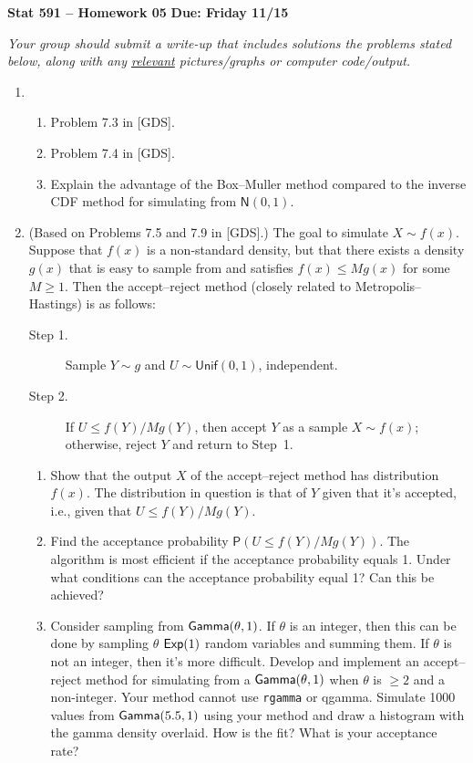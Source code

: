 \documentclass[a4paper,12pt]{article}
\newcommand{\prob}{\mathsf{P}}
\newcommand{\nm}{\mathsf{N}}
\newcommand{\unif}{\mathsf{Unif}}
\begin{document}
\noindent \large \textbf{Stat 591 -- Homework 05} \hfill \textbf{Due: Friday 11/15} \normalsize

\medskip

\noindent \emph{Your group should submit a write-up that includes solutions the problems stated below, along with any \underline{relevant} pictures/graphs or computer code/output.}  

\medskip

\begin{enumerate}

\item 
\begin{enumerate}
\item Problem 7.3 in [GDS].
\item Problem 7.4 in [GDS].  
\item Explain the advantage of the Box--Muller method compared to the inverse CDF method for simulating from $\nm(0,1)$.
\end{enumerate}

\item (Based on Problems 7.5 and 7.9 in [GDS].)  The goal to simulate $X \sim f(x)$.  Suppose that $f(x)$ is a non-standard density, but that there exists a density $g(x)$ that is easy to sample from and satisfies $f(x) \leq M g(x)$ for some $M \geq 1$.  Then the accept--reject method (closely related to Metropolis--Hastings) is as follows:  
\begin{description}
\item[\sc Step 1.] Sample $Y \sim g$ and $U \sim \unif(0,1)$, independent.  
\vspace{-1mm}
\item[\sc Step 2.] If $U \leq f(Y) / Mg(Y)$, then accept $Y$ as a sample $X \sim f(x)$; otherwise, reject $Y$ and return to Step~1. 
\end{description}
\begin{enumerate}
\item Show that the output $X$ of the accept--reject method has distribution $f(x)$.  The distribution in question is that of $Y$ given that it's accepted, i.e., given that $U \leq f(Y) / Mg(Y)$.  
\item Find the acceptance probability $\prob(U \leq f(Y) / M g(Y))$.  The algorithm is most efficient if the acceptance probability equals 1.  Under what conditions can the acceptance probability equal 1?  Can this be achieved?
\item Consider sampling from ${\sf Gamma}(\theta,1)$.  If $\theta$ is an integer, then this can be done by sampling $\theta$ ${\sf Exp}(1)$ random variables and summing them.  If $\theta$ is not an integer, then it's more difficult.  Develop and implement an accept--reject method for simulating from a ${\sf Gamma}(\theta,1)$ when $\theta$ is $\geq 2$ and a non-integer.  Your method cannot use {\tt rgamma} or {\sf qgamma}.  Simulate 1000 values from ${\sf Gamma}(5.5, 1)$ using your method and draw a histogram with the gamma density overlaid.  How is the fit?  What is your acceptance rate?  


\end{enumerate}
\end{enumerate}
\end{document}

